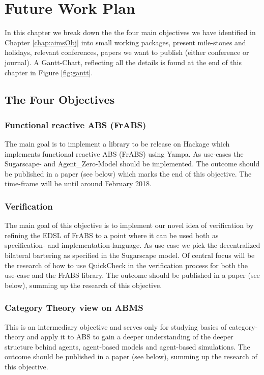 \chapter{Future Work Plan}
\label{chap:future}

In this chapter we break down the the four main objectives we have identified in Chapter \ref{chap:aimsObj} into small working packages, present mile-stones and holidays, relevant conferences, papers we want to publish (either conference or journal). A Gantt-Chart, reflecting all the details is found at the end of this chapter in Figure \ref{fig:gantt}.

\section{The Four Objectives}
\subsection{Functional reactive ABS (FrABS)}
The main goal is to implement a library to be release on Hackage which implements functional reactive ABS (FrABS) using Yampa. As use-cases the Sugarscape- and Agent\_Zero-Model should be implemented. The outcome should be published in a paper (see below) which marks the end of this objective. The time-frame will be until around February 2018.

\subsection{Verification}
The main goal of this objective is to implement our novel idea of verification by refining the EDSL of FrABS to a point where it can be used both as specification- and implementation-language. As use-case we pick the decentralized bilateral bartering as specified in the Sugarscape model. Of central focus will be the research of how to use QuickCheck in the verification process for both the use-case and the FrABS library. The outcome should be published in a paper (see below), summing up the research of this objective.

\subsection{Category Theory view on ABMS}
This is an intermediary objective and serves only for studying basics of category-theory and apply it to ABS to gain a deeper understanding of the deeper structure behind agents, agent-based models and agent-based simulations.  The outcome should be published in a paper (see below), summing up the research of this objective.

